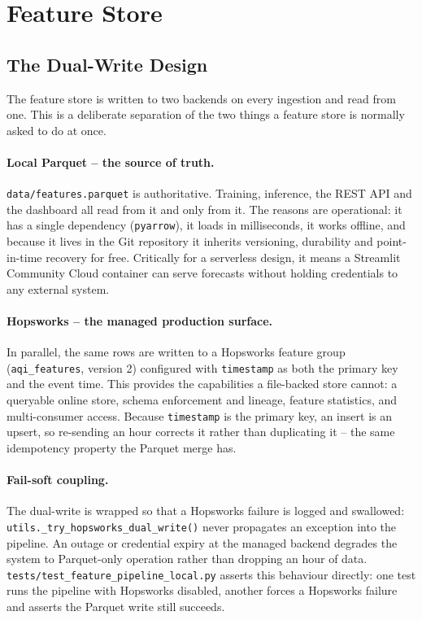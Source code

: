\documentclass[11pt,a4paper]{article}
\begin{document}
\section{Feature Store}

\subsection{The Dual-Write Design}

The feature store is written to two backends on every ingestion and read from
one. This is a deliberate separation of the two things a feature store is
normally asked to do at once.

\paragraph{Local Parquet -- the source of truth.}
\texttt{data/features.parquet} is authoritative. Training, inference, the REST
API and the dashboard all read from it and only from it. The reasons are
operational: it has a single dependency (\texttt{pyarrow}), it loads in
milliseconds, it works offline, and because it lives in the Git repository it
inherits versioning, durability and point-in-time recovery for free. Critically
for a serverless design, it means a Streamlit Community Cloud container can
serve forecasts without holding credentials to any external system.

\paragraph{Hopsworks -- the managed production surface.}
In parallel, the same rows are written to a Hopsworks feature group
(\texttt{aqi\_features}, version 2) configured with \texttt{timestamp} as both
the primary key and the event time. This provides the capabilities a
file-backed store cannot: a queryable online store, schema enforcement and
lineage, feature statistics, and multi-consumer access. Because
\texttt{timestamp} is the primary key, an insert is an upsert, so re-sending an
hour corrects it rather than duplicating it -- the same idempotency property the
Parquet merge has.

\paragraph{Fail-soft coupling.}
The dual-write is wrapped so that a Hopsworks failure is logged and swallowed:
\texttt{utils.\_try\_hopsworks\_dual\_write()} never propagates an exception
into the pipeline. An outage or credential expiry at the managed backend
degrades the system to Parquet-only operation rather than dropping an hour of
data. \texttt{tests/test\_feature\_pipeline\_local.py} asserts this behaviour
directly: one test runs the pipeline with Hopsworks disabled, another forces a
Hopsworks failure and asserts the Parquet write still succeeds.
\end{document}
